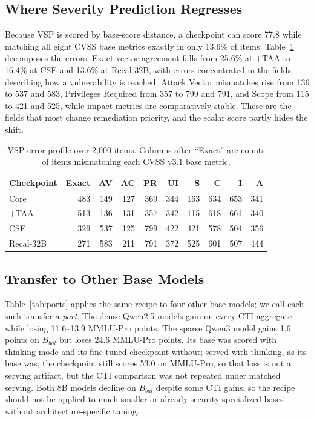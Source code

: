 \documentclass[conference]{IEEEtran}
\begin{document}
\subsection{Where Severity Prediction Regresses}
Because VSP is scored by base-score distance, a checkpoint can score 77.8 while matching all eight CVSS base metrics exactly in only 13.6\% of items. Table~\ref{tab:vsp} decomposes the errors. Exact-vector agreement falls from 25.6\% at +TAA to 16.4\% at CSE and 13.6\% at Recal-32B, with errors concentrated in the fields describing how a vulnerability is reached: Attack Vector mismatches rise from 136 to 537 and 583, Privileges Required from 357 to 799 and 791, and Scope from 115 to 421 and 525, while impact metrics are comparatively stable. These are the fields that most change remediation priority, and the scalar score partly hides the shift.

\begin{table}[t]
\caption{VSP error profile over 2,000 items. Columns after ``Exact'' are counts of items mismatching each CVSS v3.1 base metric.}
\label{tab:vsp}
\centering
\footnotesize
\setlength{\tabcolsep}{2.2pt}
\begin{tabular}{@{}lrrrrrrrrr@{}}
\toprule
Checkpoint & Exact & AV & AC & PR & UI & S & C & I & A \\
\midrule
Core & 483 & 149 & 127 & 369 & 344 & 163 & 634 & 653 & 341 \\
+TAA & 513 & 136 & 131 & 357 & 342 & 115 & 618 & 661 & 340 \\
CSE & 329 & 537 & 125 & 799 & 422 & 421 & 578 & 504 & 356 \\
Recal-32B & 271 & 583 & 211 & 791 & 372 & 525 & 601 & 507 & 444 \\
\bottomrule
\end{tabular}
\end{table}

\subsection{Transfer to Other Base Models}\label{sec:ports}
Table~\ref{tab:ports} applies the same recipe to four other base models; we call each such transfer a \emph{port}. The dense Qwen2.5 models gain on every CTI aggregate while losing 11.6--13.9 MMLU-Pro points. The sparse Qwen3 model gains 1.6 points on $B_{bal}$ but loses 24.6 MMLU-Pro points. Its base was scored with thinking mode and its fine-tuned checkpoint without; served with thinking, as its base was, the checkpoint still scores 53.0 on MMLU-Pro, so that loss is not a serving artifact, but the CTI comparison was not repeated under matched serving.
Both 8B models decline on $B_{bal}$ despite some CTI gains, so the recipe should not be applied to much smaller or already security-specialized bases without architecture-specific tuning.
\end{document}
